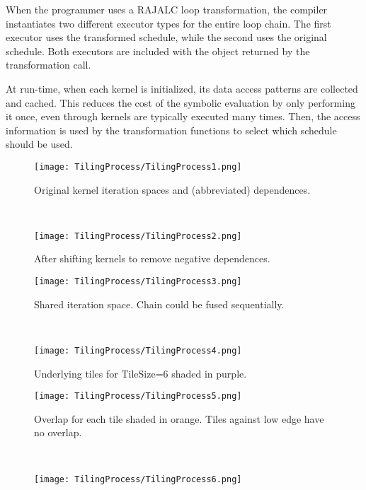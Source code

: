 When the programmer uses a RAJALC loop transformation, the compiler instantiates two different executor types for the entire loop chain. 
The first executor uses the transformed schedule, while the second uses the original schedule. 
Both executors are included with the object returned by the transformation call.

At run-time, when each kernel is initialized, its data access patterns are collected and cached. 
This reduces the cost of the symbolic evaluation by only performing it once, even through kernels are typically executed many times.
Then, the access information is used by the transformation functions to select which schedule should be used.


\begin{figure*}
	\centering

	\begin{subfigure}[t]{0.5\textwidth}
		\centering
		\texttt{[image: TilingProcess/TilingProcess1.png]}
		\caption{Original kernel iteration spaces and (abbreviated) dependences.}
		\label{tiling1}
	\end{subfigure}
	~
	\begin{subfigure}[t]{0.5\textwidth}
		\centering
		\texttt{[image: TilingProcess/TilingProcess2.png]}
		\caption{After shifting kernels to remove negative dependences.}
		\label{tiling2}
	\end{subfigure}
	\par\bigskip
	\begin{subfigure}[t]{0.5\textwidth}
		\centering
		\texttt{[image: TilingProcess/TilingProcess3.png]}
		\caption{Shared iteration space. Chain could be fused sequentially.}
		\label{tiling3}
	\end{subfigure}
	~
	\begin{subfigure}[t]{0.5\textwidth}
		\centering
		\texttt{[image: TilingProcess/TilingProcess4.png]}
		\caption{Underlying tiles for TileSize=6 shaded in purple.}
		\label{tiling4}
	\end{subfigure}
	\par\bigskip
	\begin{subfigure}[t]{0.5\textwidth}
		\centering
		\texttt{[image: TilingProcess/TilingProcess5.png]}
		\caption{Overlap for each tile shaded in orange. Tiles against low edge have no overlap.}
	\end{subfigure}
	~
	\begin{subfigure}[t]{0.5\textwidth}
		\centering
		\texttt{[image: TilingProcess/TilingProcess6.png]}

\end{subfigure}
\end{figure*}
